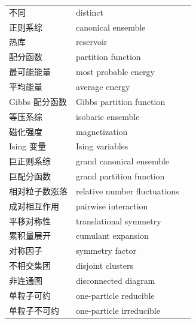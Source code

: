 \begin{xltabular}{\textwidth}{@{}l l c@{}}
  不同 & {\glossaryfont distinct} & \pageref{term:4.distinct} \\
  正则系综 & {\glossaryfont canonical ensemble} & \pageref{term:4.canonical-ensemble} \\
  热库 & {\glossaryfont reservoir} & \pageref{term:4.reservoir} \\
  配分函数 & {\glossaryfont partition function} & \pageref{term:4.partition-function} \\
  最可能能量 & {\glossaryfont most probable energy} & \pageref{term:4.most-probable-energy} \\
  平均能量 & {\glossaryfont average energy} & \pageref{term:4.average-energy} \\
  Gibbs 配分函数 & {\glossaryfont Gibbs partition function} & \pageref{term:4.gibbs-partition-function} \\
  等压系综 & {\glossaryfont isobaric ensemble} & \pageref{term:4.isobaric} \\
  磁化强度 & {\glossaryfont magnetization} & \pageref{term:4.magnetization} \\
  Ising 变量 & {\glossaryfont Ising variables} & \pageref{term:4.ising-variables} \\
  巨正则系综 & {\glossaryfont grand canonical ensemble} & \pageref{term:4.grand-canonical} \\
  巨配分函数 & {\glossaryfont grand partition function} & \pageref{term:4.grand-partition} \\
  相对粒子数涨落 & {\glossaryfont relative number fluctuations} & \pageref{term:4.relative-fluctuations} \\
  成对相互作用 & {\glossaryfont pairwise interaction} & \pageref{term:5.pairwise} \\
  平移对称性 & {\glossaryfont translational symmetry} & \pageref{term:5.translational} \\
  累积量展开 & {\glossaryfont cumulant expansion} & \pageref{term:5.cumulant-expansion} \\
  对称因子 & {\glossaryfont symmetry factor} & \pageref{term:5.symmetry-factor} \\
  不相交集团 & {\glossaryfont disjoint clusters} & \pageref{term:5.disjoint} \\
  非连通图 & {\glossaryfont disconnected diagram} & \pageref{term:5.disconnected} \\
  单粒子可约 & {\glossaryfont one-particle reducible} & \pageref{term:5.one-particle-reducible} \\
  单粒子不可约 & {\glossaryfont one-particle irreducible} & \pageref{term:5.one-particle-irreducible} \\

\end{xltabular}
